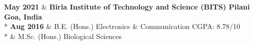 \newcommand\educationCust[7]{
  \textbf{#1}    & \textbf{#2} \hfill \textbf{#3}   					\\*
  \textbf{#4}    & #6          \hfill  CGPA: #7/10                      \\*
                 & #5
  }

\begin{educations}
  \educationCust
    {May 2021}   {Birla Institute of Technology and Science (BITS) Pilani}{Goa, India}
    {Aug 2016}  {M.Sc. (Hons.) Biological Sciences}
                {B.E.  (Hons.) Electronics \& Communication}  
    {8.78}
\end{educations}
\vspace{-3mm}

